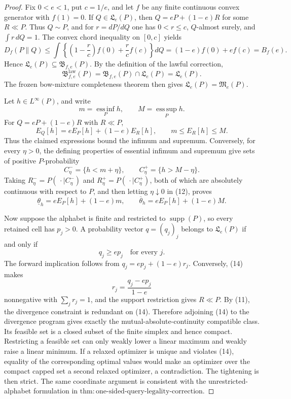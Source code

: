 \documentclass{article}
\begin{document}
\begin{proof}
Fix \(0<e<1\), put \(c=1/e\), and let \(f\) be any finite continuous convex generator with \(f(1)=0\).  If \(Q\in\mathfrak L_e(P)\), then \(Q=eP+(1-e)R\) for some \(R\ll P\).  Thus \(Q\sim P\), and for \(r=dP/dQ\) one has \(0<r\le c\), \(Q\)-almost surely, and \(\int r\,dQ=1\).  The convex chord inequality on \([0,c]\) yields
\[
 D_f(P\|Q)
 \le\int\left\{\left(1-\frac rc\right)f(0)+\frac rc f(c)\right\}dQ
 =(1-e)f(0)+ef(c)=B_f(e). \tag{11}
\]
Hence \(\mathfrak L_e(P)\subseteq\mathfrak B_{f,e}(P)\).  By the definition of the lawful correction,
\[
 \mathfrak B^{\mathrm{law}}_{f,e}(P)
 =\mathfrak B_{f,e}(P)\cap\mathfrak L_e(P)
 =\mathfrak L_e(P).
\]
The frozen bow-mixture completeness theorem then gives \(\mathfrak L_e(P)=\mathfrak M_e(P)\).

Let \(h\in L^\infty(P)\), and write
\[
 m=\operatorname*{ess\,inf}_P h,\qquad M=\operatorname*{ess\,sup}_P h.
\]
For \(Q=eP+(1-e)R\) with \(R\ll P\),
\[
 E_Q[h]=eE_P[h]+(1-e)E_R[h],\qquad m\le E_R[h]\le M. \tag{12}
\]
Thus the claimed expressions bound the infimum and supremum.  Conversely, for every \(\eta>0\), the defining properties of essential infimum and supremum give sets of positive \(P\)-probability
\[
 C^-_\eta=\{h<m+\eta\},\qquad C^+_\eta=\{h>M-\eta\}.
\]
Taking \(R^-_\eta=P(\,\cdot\mid C^-_\eta)\) and \(R^+_\eta=P(\,\cdot\mid C^+_\eta)\), both of which are absolutely continuous with respect to \(P\), and then letting \(\eta\downarrow0\) in (12), proves
\[
 \underline\theta_h=eE_P[h]+(1-e)m,\qquad
 \overline\theta_h=eE_P[h]+(1-e)M. \tag{13}
\]

Now suppose the alphabet is finite and restricted to \(\operatorname{supp}(P)\), so every retained cell has \(p_j>0\).  A probability vector \(q=(q_j)_j\) belongs to \(\mathfrak L_e(P)\) if and only if
\[
 q_j\ge ep_j\quad\text{for every }j. \tag{14}
\]
The forward implication follows from \(q_j=ep_j+(1-e)r_j\).  Conversely, (14) makes
\[
 r_j=\frac{q_j-ep_j}{1-e}
\]
nonnegative with \(\sum_jr_j=1\), and the support restriction gives \(R\ll P\).  By (11), the divergence constraint is redundant on (14).  Therefore adjoining (14) to the divergence program gives exactly the mutual-absolute-continuity compatible class.  Its feasible set is a closed subset of the finite simplex and hence compact.  Restricting a feasible set can only weakly lower a linear maximum and weakly raise a linear minimum.  If a relaxed optimizer is unique and violates (14), equality of the corresponding optimal values would make an optimizer over the compact capped set a second relaxed optimizer, a contradiction.  The tightening is then strict.  The same coordinate argument is consistent with the unrestricted-alphabet formulation in \(\mathrm{thm:one\text{-}sided\text{-}query\text{-}legality\text{-}correction}\).


\end{proof}
\end{document}
